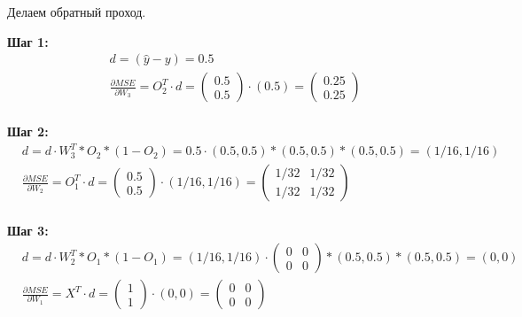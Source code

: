 \begin{sol}
\begin{center}
\end{center}

Делаем обратный проход. 

\textbf{Шаг 1:}
\begin{equation*} 
	\begin{aligned}
		&  d = (\hat{y} - y) = 0.5 \\
		&  \frac{\partial MSE}{\partial W_3} = O_2^T \cdot  d = \begin{pmatrix} 0.5 \\ 0.5 \end{pmatrix}  \cdot (0.5) = \begin{pmatrix} 0.25 \\ 0.25 \end{pmatrix} \\
	\end{aligned}
\end{equation*}
	
\textbf{Шаг 2:}
\begin{equation*} 
	\begin{aligned}
		&  d = d \cdot W_3^T * O_2 * (1 - O_2) = 0.5 \cdot  (0.5, 0.5) * (0.5, 0.5) * (0.5, 0.5) = (1/16, 1/16) \\
		&  \frac{\partial MSE}{\partial W_2} = O_1^T \cdot d = \begin{pmatrix} 0.5 \\ 0.5 \end{pmatrix} \cdot (1/16, 1/16) = \begin{pmatrix} 1/32 & 1/32 \\ 1/32 & 1/32 \end{pmatrix} \\
	\end{aligned}
\end{equation*}

\textbf{Шаг 3:}
\begin{equation*} 
	\begin{aligned}
		&  d = d \cdot W_2^T * O_1 * (1 - O_1) = (1/16, 1/16) \cdot  \begin{pmatrix} 0 & 0 \\ 0 & 0 \end{pmatrix} * (0.5, 0.5) * (0.5, 0.5) = (0, 0) \\
		&  \frac{\partial MSE}{\partial W_1} = X^T \cdot d = \begin{pmatrix} 1 \\ 1 \end{pmatrix} \cdot (0, 0) = \begin{pmatrix} 0 & 0 \\ 0 & 0 \end{pmatrix} \\
	\end{aligned}
\end{equation*}


\end{sol}
